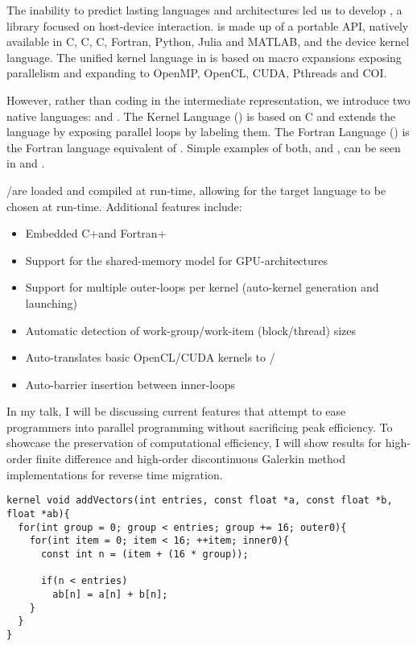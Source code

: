 \documentclass[12pt]{article}
\begin{document}
\pagestyle{empty}

\placeTitlePage

The inability to predict lasting languages and architectures led us to develop \occa, a library focused on host-device interaction.
\occa is made up of a portable API, natively available in C, C\tf{++}, C\tf{\#}, Fortran, Python, Julia and MATLAB, and the device kernel language.
The unified kernel language in \occa is based on macro expansions exposing parallelism and expanding to OpenMP, OpenCL, CUDA, Pthreads and COI.

However, rather than coding in the \occa intermediate representation, we introduce two native languages: \okl and \ofl.
The \occa Kernel Language (\okl) is based on C and extends the language by exposing parallel loops by labeling them.
The \occa Fortran Language (\ofl) is the Fortran language equivalent of \okl.
Simple examples of both, \okl and \ofl, can be seen in  and .

\okl/\ofl are loaded and compiled at run-time, allowing for the target language to be chosen at run-time.
Additional features include:
\begin{itemize}
\item Embedded C+\okl and Fortran+\ofl
\item Support for the shared-memory model for GPU-architectures
\item Support for multiple outer-loops per kernel (auto-kernel generation and launching)
\item Automatic detection of work-group/work-item (block/thread) sizes
\item Auto-translates basic OpenCL/CUDA kernels to \okl/\ofl
\item Auto-barrier insertion between inner-loops
\end{itemize}

In my talk, I will be discussing current features that attempt to ease programmers into parallel programming without sacrificing peak efficiency.
To showcase the preservation of computational efficiency, I will show results for high-order finite difference and high-order discontinuous Galerkin method implementations for reverse time migration.
\newpage

\vspace{4mm}
\begin{lstlisting}[caption={Adding two vectors using the \occa Kernel Language (\okl)},label={lst:addVectors}]
kernel void addVectors(int entries, const float *a, const float *b, float *ab){
  for(int group = 0; group < entries; group += 16; outer0){
    for(int item = 0; item < 16; ++item; inner0){
      const int n = (item + (16 * group));

      if(n < entries)
        ab[n] = a[n] + b[n];
    }
  }
}
\end{lstlisting}
\end{document}
